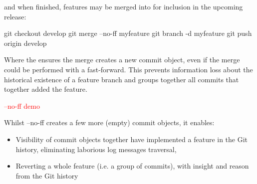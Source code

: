 \noindent and when finished, features may be merged into  for inclusion in the upcoming release:

\begin{git-bash}
    git checkout develop
    git merge --no-ff myfeature
    git branch -d myfeature
    git push origin develop
\end{git-bash}

Where the  ensures the merge creates a new commit object, even if the merge could be performed with a fast-forward. This prevents information loss about the historical existence of a feature branch and groups together all commits that together added the feature.

\hfill\textcolor{red}{\ttfamily --no-ff demo}\hfill \newline

\noindent Whilst --no-ff creates a few more (empty) commit objects, it enables:

\begin{itemize}
	\item Visibility of commit objects together have implemented a feature in the Git history, eliminating laborious log messages traversal,
	\item Reverting a whole feature (i.e. a group of commits), with insight and reason from the Git history
\end{itemize}














